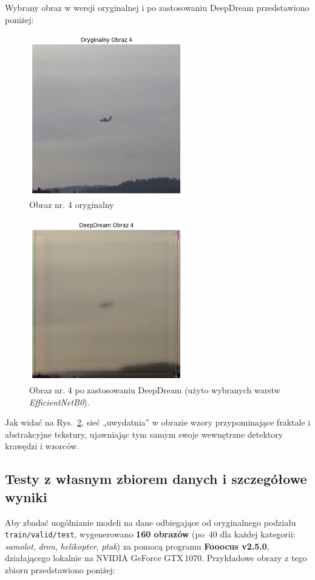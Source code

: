 Wybrany obraz w wersji oryginalnej i po zastosowaniu DeepDream przedstawiono poniżej:
\begin{figure}[H]
    \centering
    \includegraphics[width=0.6\textwidth]{img/zad3/original4.png}
    \caption{Obraz nr. 4 oryginalny}
    \label{fig:z3_deepdream}
\end{figure}
\begin{figure}[H]
    \centering
    \includegraphics[width=0.6\textwidth]{img/zad3/deepdream4.png}
    \caption{Obraz nr. 4 po zastosowaniu DeepDream (użyto wybranych warstw \emph{EfficientNetB0}).}
    \label{fig:z3_deepdream}
\end{figure}


Jak widać na Rys.~\ref{fig:z3_deepdream}, sieć „uwydatnia” w obrazie wzory przypominające fraktale i abstrakcyjne tekstury, ujawniając tym samym swoje wewnętrzne detektory krawędzi i wzorców.


\subsection{Testy z własnym zbiorem danych i szczegółowe wyniki}
Aby zbadać uogólnianie modeli na dane odbiegające od oryginalnego podziału \texttt{train/valid/test}, wygenerowano \textbf{160 obrazów} (po~40 dla każdej kategorii: \textit{samolot}, \textit{dron}, \textit{helikopter}, \textit{ptak}) za pomocą programu \textbf{Fooocus v2.5.0}, działającego lokalnie na NVIDIA GeForce GTX\,1070.
Przykładowe obrazy z tego zbioru przedstawiono poniżej:

